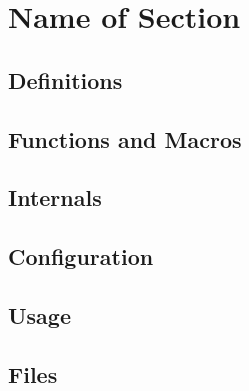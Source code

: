\section{Name of Section}

\subsection{Definitions}

\subsection{Functions and Macros}

\subsection{Internals}

\subsection{Configuration}


\subsection{Usage}

\subsection{Files}
